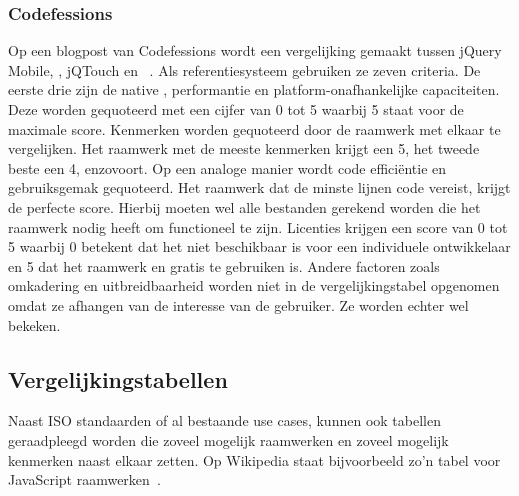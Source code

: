 \subsubsection{Codefessions}
Op een blogpost van Codefessions wordt een vergelijking gemaakt tussen jQuery Mobile, \st{}, jQTouch en \kendo{}~\cite{Sarrafi2012}.  
Als referentiesysteem gebruiken ze zeven criteria.  De eerste drie zijn de native , performantie en platform-onafhankelijke capaciteiten.  
Deze worden gequoteerd met een cijfer van 0 tot 5 waarbij 5 staat voor de maximale score. 
Kenmerken worden gequoteerd door de raamwerk met elkaar te vergelijken.  
Het raamwerk met de meeste kenmerken krijgt een 5, het tweede beste een 4, enzovoort.  
Op een analoge manier wordt code efficiëntie en gebruiksgemak gequoteerd.  
Het raamwerk dat de minste lijnen code vereist, krijgt de perfecte score. 
Hierbij moeten wel alle bestanden gerekend worden die het raamwerk nodig heeft om functioneel te zijn. 
Licenties krijgen een score van 0 tot 5 waarbij 0 betekent dat het niet beschikbaar is voor een individuele ontwikkelaar en 5 dat het raamwerk  en gratis te gebruiken is. 
Andere factoren zoals omkadering en uitbreidbaarheid worden niet in de vergelijkingstabel opgenomen omdat ze afhangen van de interesse van de gebruiker.  
Ze worden echter wel bekeken.


\subsection{Vergelijkingstabellen}
Naast ISO standaarden of al bestaande use cases, kunnen ook tabellen geraadpleegd worden die zoveel mogelijk raamwerken en zoveel mogelijk kenmerken naast elkaar zetten.  
Op Wikipedia staat bijvoorbeeld zo'n tabel voor JavaScript raamwerken~\cite{Wikipedia}.  

